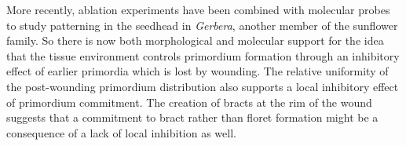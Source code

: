 More recently, ablation experiments have been combined with molecular probes to study patterning in the seedhead in \textit{Gerbera}, another member of the sunflower family.
So there is now both morphological and molecular support for the idea that the tissue environment controls  primordium formation through an inhibitory  effect of earlier primordia which is  lost by wounding.  The relative uniformity of the post-wounding primordium distribution also supports a local inhibitory effect of primordium commitment. The creation of bracts at the rim of the wound suggests that a commitment to bract rather than floret formation might be a consequence of a lack of local inhibition as well. 

  